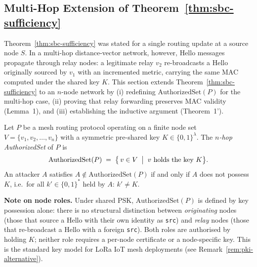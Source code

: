 

\subsection{Multi-Hop Extension of Theorem~\ref{thm:sbc-sufficiency}}
\label{subsec:multihop}

Theorem~\ref{thm:sbc-sufficiency} was stated for a single routing update
at a source node $S$.  In a multi-hop distance-vector network, however,
Hello messages propagate through relay nodes: a legitimate relay $v_2$
re-broadcasts a Hello originally sourced by $v_1$ with an incremented
metric, carrying the same MAC computed under the shared key $K$.  This
section extends Theorem~\ref{thm:sbc-sufficiency} to an $n$-node network
by (i) redefining $\mathrm{AuthorizedSet}(P)$ for the multi-hop case,
(ii) proving that relay forwarding preserves MAC validity (Lemma~1), and
(iii) establishing the inductive argument (Theorem~1').


\begin{definition}
\label{def:authorized-set-nhop}
Let $P$ be a mesh routing protocol operating on a finite node set
$V = \{v_1, v_2, \ldots, v_n\}$ with a symmetric pre-shared key
$K \in \{0,1\}^\lambda$.
The \emph{$n$-hop AuthorizedSet} of $P$ is
\[
  \mathrm{AuthorizedSet}(P)
  \;=\;
  \bigl\{\, v \in V \;\bigm|\; v \text{ holds the key } K \bigr\}.
\]
An attacker $A$ satisfies $A \notin \mathrm{AuthorizedSet}(P)$
if and only if $A$ does not possess $K$, i.e.\ for all $k' \in \{0,1\}^*$
held by $A$: $k' \neq K$.

\medskip
\noindent\textbf{Note on node roles.}\;
Under shared PSK, $\mathrm{AuthorizedSet}(P)$ is defined by key possession
alone: there is no structural distinction between \emph{originating} nodes
(those that source a Hello with their own identity as \texttt{src}) and
\emph{relay} nodes (those that re-broadcast a Hello with a foreign
\texttt{src}).
Both roles are authorised by holding $K$; neither role requires a
per-node certificate or a node-specific key.
This is the standard key model for LoRa IoT mesh deployments
(see Remark~\ref{rem:pki-alternative}).
\end{definition}

